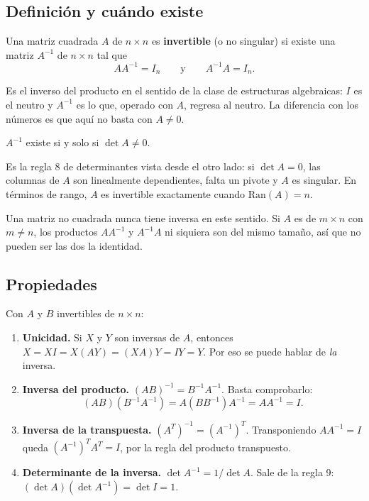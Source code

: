 \documentclass[11pt,letterpaper]{article}
\begin{document}
\subsection*{Definición y cuándo existe}

\begin{definicion}
    Una matriz cuadrada $A$ de $n \times n$ es \textbf{invertible} (o
    no singular) si existe una matriz $A^{-1}$ de $n \times n$ tal que
    \[
        A A^{-1} = I_n \qquad \text{y} \qquad A^{-1} A = I_n .
    \]
\end{definicion}

Es el inverso del producto en el sentido de la clase de estructuras
algebraicas: $I$ es el neutro y $A^{-1}$ es lo que, operado con $A$,
regresa al neutro. La diferencia con los números es que aquí no basta
con $A \neq 0$.

\begin{teorema}[Existencia]
    $A^{-1}$ existe si y solo si $\det A \neq 0$.
\end{teorema}

Es la regla 8 de determinantes vista desde el otro lado: si
$\det A = 0$, las columnas de $A$ son linealmente dependientes, falta
un pivote y $A$ es singular. En términos de rango, $A$ es invertible
exactamente cuando $\mathrm{Ran}(A) = n$.

\begin{ojo}
    Una matriz no cuadrada nunca tiene inversa en este sentido. Si $A$
    es de $m \times n$ con $m \neq n$, los productos $AA^{-1}$ y
    $A^{-1}A$ ni siquiera son del mismo tamaño, así que no pueden ser
    las dos la identidad.
\end{ojo}


\subsection*{Propiedades}

Con $A$ y $B$ invertibles de $n \times n$:

\begin{enumerate}[itemsep=0.3em]
    \item \textbf{Unicidad.} Si $X$ y $Y$ son inversas de $A$, entonces
          $X = XI = X(AY) = (XA)Y = IY = Y$. Por eso se puede hablar
          de \emph{la} inversa.
    \item \textbf{Inversa del producto.} $(AB)^{-1} = B^{-1}A^{-1}$.
          Basta comprobarlo:
          \[
              (AB)(B^{-1}A^{-1}) = A(BB^{-1})A^{-1} = AA^{-1} = I .
          \]
    \item \textbf{Inversa de la transpuesta.}
          $(A^{T})^{-1} = (A^{-1})^{T}$. Transponiendo $AA^{-1} = I$
          queda $(A^{-1})^{T}A^{T} = I$, por la regla del producto
          transpuesto.
    \item \textbf{Determinante de la inversa.}
          $\det A^{-1} = 1/\det A$. Sale de la regla 9:
          $(\det A)(\det A^{-1}) = \det I = 1$.
\end{enumerate}
\end{document}

